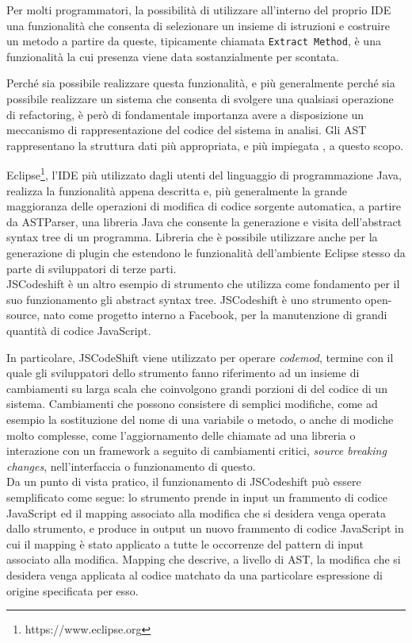 Per molti programmatori, la possibilità di utilizzare all’interno del proprio
IDE una funzionalità che consenta di selezionare un insieme di istruzioni e
costruire un metodo a partire da queste, tipicamente chiamata \texttt{Extract
Method}, è una funzionalità la cui presenza viene data sostanzialmente per
scontata.

Perché sia possibile realizzare questa funzionalità, e più generalmente perché
sia possibile realizzare un sistema che consenta di svolgere una qualsiasi
operazione di refactoring, è però di fondamentale importanza avere a
disposizione un meccanismo di rappresentazione del codice del sistema in
analisi. Gli AST rappresentano la struttura dati più appropriata, e più
impiegata \cite{eclipse2006} \cite{netbeans2007}, a questo scopo.

Eclipse\footnote{https://www.eclipse.org}, l’IDE più utilizzato dagli utenti del
linguaggio di programmazione Java, realizza la funzionalità appena descritta e,
più generalmente la grande maggioranza delle operazioni di modifica di codice
sorgente automatica, a partire da ASTParser, una libreria Java che consente la
generazione e visita dell’abstract syntax tree di un programma. Libreria che è
possibile utilizzare anche per la generazione di plugin che estendono le
funzionalità dell’ambiente Eclipse stesso da parte di sviluppatori di terze
parti.\\

JSCodeshift \cite{jscodeshift2016} è un altro esempio di strumento che utilizza
come fondamento per il suo funzionamento gli abstract syntax tree. JSCodeshift
è uno strumento open-source, nato come progetto interno a Facebook\texttrademark,
per la manutenzione di grandi quantità di codice JavaScript.

In particolare, JSCodeShift viene utilizzato per operare \textit{codemod},
termine con il quale gli sviluppatori dello strumento fanno riferimento ad un
insieme di cambiamenti su larga scala che coinvolgono grandi porzioni di del
codice di un sistema. Cambiamenti che possono consistere di semplici modifiche,
come ad esempio la sostituzione del nome di una variabile o metodo, o anche di
modiche molto complesse, come l'aggiornamento delle chiamate ad una libreria o
interazione con un framework a seguito di cambiamenti critici, \textit{source
breaking changes}, nell'interfaccia o funzionamento di questo.\\

Da un punto di vista pratico, il funzionamento di JSCodeshift può essere
semplificato come segue: lo strumento prende in input un frammento di codice
JavaScript ed il mapping associato alla modifica che si desidera venga operata
dallo strumento, e produce in output un nuovo frammento di codice JavaScript in
cui il mapping è stato applicato a tutte le occorrenze del pattern di input
associato alla modifica. Mapping che descrive, a livello di AST, la modifica che
si desidera venga applicata al codice matchato da una particolare espressione di
origine specificata per esso.

